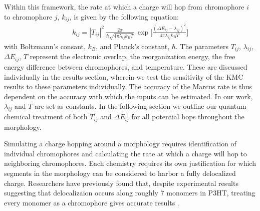 Within this framework, the rate at which a charge will hop from chromophore $i$ to chromophore $j$, $k_{ij}$,
is given by the following equation:
\begin{align}
    k_{ij}  =  |T_{ij}|^2\ \frac{2\pi}{\hbar \sqrt{4 \pi \lambda_{ij} k_{B} T}}\ \exp{\Bigg[ \frac{(\Delta
    E_{ij} - \lambda_{ij})^2}{ 4 \pi \lambda_{ij} k_{B} T} \Bigg] }
    \label{marcus}
\end{align}
with Boltzmann's consant, $k_{B}$, and Planck's constant, $\hbar$. The parameters $T_{ij}$, $\lambda_{ij}$,
$\Delta E_{ij}$, $T$ represent the electronic overlap, the reorganization energy, the free energy difference
between chromophores, and
temperature. These are discussed individually in the results section, wherein we test the sensitivity of
the KMC results to these parameters individually.
The accuracy of the Marcus rate is thus dependent on the accuracy with which the inputs can be estimated. In
our work, $\lambda_{ij}$ and $T$ are set as constants. In
the following section we outline our quantum chemical treatment of both $T_{ij}$ and $\Delta E_{ij}$ for all
potential hops throughout the morphology.

Simulating a charge hopping around a morphology requires identification of
individual chromophores and calculating the rate at which a charge will hop to neighboring
chromophores. 
Each chemistry requires its own justification for which segments in the morphology 
can be considered to harbor a fully delocalized charge. 
Researchers have previously found that, despite experimental results suggesting that delocalizaion occurs along roughly 7 monomers in P3HT, treating every monomer as a chromophore gives accurate results \cite{jones2017}.

